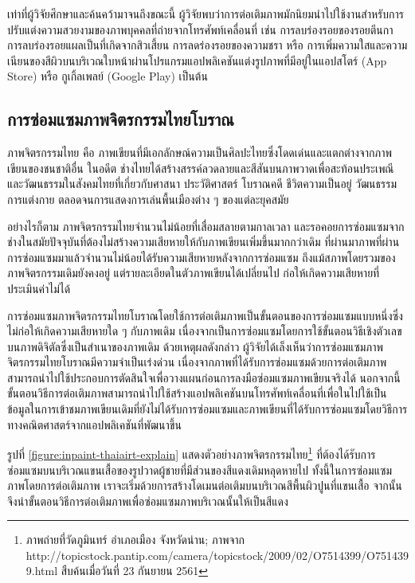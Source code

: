 

\hspace{1cm} เท่าที่ผู้วิจัยศึกษาและค้นคว้ามาจนถึงขณะนี้ ผู้วิจัยพบว่าการต่อเติมภาพมักนิยมนำไปใช้งานสำหรับการปรับแต่งความสวยงามของภาพบุคคลที่ถ่ายจากโทรศัพท์เคลื่อนที่ เช่น การลบร่องรอยของรอยตีนกา การลบร่องรอยแผลเป็นที่เกิดจากสิวเสี้ยน การลดร่องรอยของความชรา หรือ การเพิ่มความใสและความเนียนของสีผิวบนบริเวณใบหน้าผ่านโปรแกรมแอปพลิเคชันแต่งรูปภาพที่มีอยู่ในแอปสโตร์ (App Store) หรือ กูเกิ้ลเพลย์ (Google Play) เป็นต้น 
	
\subsection{การซ่อมแซมภาพจิตรกรรมไทยโบราณ}

\hspace{1cm} ภาพจิตรกรรมไทย คือ ภาพเขียนที่มีเอกลักษณ์ความเป็นศิลปะไทยซึ่งโดดเด่นและแตกต่างจากภาพเขียนของชนชาติอื่น ในอดีต  ช่างไทยได้สร้างสรรค์ลวดลายและสีสันบนภาพวาดเพื่อสะท้อนประเพณีและวัฒนธรรมในสังคมไทยที่เกี่ยวกับศาสนา ประวัติศาสตร์ โบราณคดี ชีวิตความเป็นอยู่ วัฒนธรรมการแต่งกาย ตลอดจนการแสดงการเล่นพื้นเมืองต่าง ๆ ของแต่ละยุคสมัย 
	
\hspace{1cm} อย่างไรก็ตาม ภาพจิตรกรรมไทยจำนวนไม่น้อยที่เสื่อมสลายตามกาลเวลา และรอคอยการซ่อมแซมจากช่างในสมัยปัจจุบันที่ต้องไม่สร้างความเสียหายให้กับภาพเขียนเพิ่มขึ้นมากกว่าเดิม  ที่ผ่านมาภาพที่ผ่านการซ่อมแซมมาแล้วจำนวนไม่น้อยได้รับความเสียหายหลังจากการซ่อมแซม ถึงแม้สภาพโดยรวมของภาพจิตรกรรมเดิมยังคงอยู่ แต่รายละเอียดในตัวภาพเขียนได้เปลี่ยนไป ก่อให้เกิดความเสียหายที่ประเมินค่าไม่ได้ 
	
\hspace{1cm} การซ่อมแซมภาพจิตรกรรมไทยโบราณโดยใช้การต่อเติมภาพเป็นขั้นตอนของการซ่อมแซมแบบหนึ่งซึ่งไม่ก่อให้เกิดความเสียหายใด ๆ กับภาพเดิม เนื่องจากเป็นการซ่อมแซมโดยการใช้ขั้นตอนวิธีเชิงตัวเลขบนภาพดิจิตัลซึ่งเป็นสำเนาของภาพเดิม ด้วยเหตุผลดังกล่าว ผู้วิจัยได้เล็งเห็นว่าการซ่อมแซมภาพจิตรกรรมไทยโบราณมีความจำเป็นเร่งด่วน เนื่องจากภาพที่ได้รับการซ่อมแซมด้วยการต่อเติมภาพสามารถนำไปใช้ประกอบการตัดสินใจเพื่อวางแผนก่อนการลงมือซ่อมแซมภาพเขียนจริงได้ นอกจากนี้ ขั้นตอนวิธีการต่อเติมภาพสามารถนำไปใช้สร้างแอปพลิเคชันบนโทรศัพท์เคลื่อนที่เพื่อในไปใช้เป็นข้อมูลในการเข้าชมภาพเขียนเดิมที่ยังไม่ได้รับการซ่อมแซมและภาพเขียนที่ได้รับการซ่อมแซมโดยวิธีการทางคณิตศาสตร์จากแอปพลิเคชันที่พัฒนาขึ้น
	
\hspace{1cm} รูปที่ \ref{figure:inpaint-thaiairt-explain} แสดงตัวอย่างภาพจิตรกรรมไทย\footnote{ภาพถ่ายที่วัดภูมินทร์ อำเภอเมือง จังหวัดน่าน; ภาพจาก http://topicstock.pantip.com/camera/topicstock/2009/02/O7514399/O7514399.html สืบค้นเมื่อวันที่ 23 กันยายน 2561} ที่ต้องได้รับการซ่อมแซมบนบริเวณแขนเสื้อของรูปวาดผู้ชายที่มีส่วนของสีแดงเดิมหลุดหายไป ทั้งนี้ในการซ่อมแซมภาพโดยการต่อเติมภาพ เราจะเริ่มด้วยการสร้างโดเมนต่อเติมบนบริเวณสีพื้นผิวปูนที่แขนเสื้อ จากนั้นจึงนำขั้นตอนวิธีการต่อเติมภาพเพื่อซ่อมแซมภาพบริเวณนั้นให้เป็นสีแดง 

